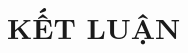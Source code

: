 \documentclass[a4paper,13pt,3p,twoside]{report}
\renewcommand{\bibname}{Danh_sach_tai_lieu_tham_khao}
\theoremstyle{definition}
\begin{document}
\newpage
\chapter{KẾT LUẬN}


% 




    
% 

% 
\end{document}
